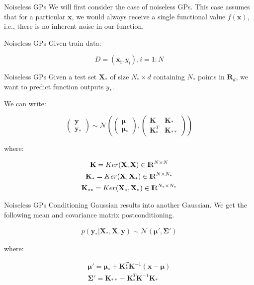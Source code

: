 \documentclass{beamer}
\begin{document}
	\begin{frame}{Noiseless GPs}
		We will first consider the case of noiseless GPs. This case assumes that for a particular $\mathbf{x}$, we would always receive a single functional value $f(\mathbf{x})$, i.e., there is no inherent noise in our function.
	\end{frame}
	
	\begin{frame}{Noiseless GPs}
		Given train data:
		
		$$D = {(\mathbf{x_i}, y_i), i = 1:N}$$
	\end{frame}
	
	
	\begin{frame}{Noiseless GPs}
		Given a test set $\mathbf{X}_{\ast}$ of size $N_{\ast} \times d$ containing $N_{\ast}$ points in $\mathbf{R}_d$, we want to predict function outputs $y_{\ast}$.
		
		We can write:
		
		$$\begin{pmatrix}
		\mathbf{y} \\
		\mathbf{y}_*
		\end{pmatrix}  \sim \mathcal{N} \left( \begin{pmatrix}
		\bm{\mu} \\
		\bm{\mu}_*
		\end{pmatrix} , \begin{pmatrix}
		\mathbf{K} & \mathbf{K}_* \\
		\mathbf{K}_*^T & \mathbf{K}_{**}
		\end{pmatrix} \right)$$
		
		where:
		
		\begin{gather}
		\mathbf{K} = Ker(\mathbf{X}, \mathbf{X}) \in {\rm I\!R}^{N\times N} \label{eq1}\\
		\mathbf{K}_* = Ker(\mathbf{X}, \mathbf{X}_*) \in {\rm I\!R}^{N\times N_*} \label{eq2}\\
		\mathbf{K}_{**} = Ker(\mathbf{X}_*, \mathbf{X}_*) \in {\rm I\!R}^{N_*\times N_*} \label{eq3}
		\end{gather}
	\end{frame}
	
	\begin{frame}{Noiseless GPs}
		Conditioning Gaussian results into another Gaussian. We get the following mean and covariance matrix postconditioning.
		
		\begin{gather}
		p(\mathbf{y}_*|\mathbf{X}_*, \mathbf{X}, \mathbf{y}) \sim \mathcal{N}(\bm{\mu}', \bm{\Sigma}')
		\end{gather}
		
		where:
		
		\begin{gather}
		\bm{\mu}' = \bm{\mu}_* + \mathbf{K}_*^T\mathbf{K}^{-1}(\mathbf{x}-\bm{\mu}) \\
		\bm{\Sigma}' = \mathbf{K}_{**} - \mathbf{K}_*^T\mathbf{K}^{-1}\mathbf{K}_*
		\end{gather}
	\end{frame}
	
\end{document}
